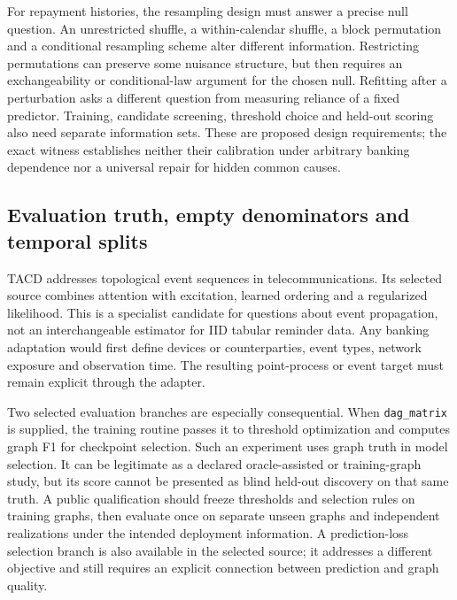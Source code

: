 For repayment histories, the resampling design must answer a precise null question. An unrestricted
shuffle, a within-calendar shuffle, a block permutation and a conditional resampling scheme alter
different information. Restricting permutations can preserve some nuisance structure, but then
requires an exchangeability or conditional-law argument for the chosen null. Refitting after a
perturbation asks a different question from measuring reliance of a fixed predictor. Training,
candidate screening, threshold choice and held-out scoring also need separate information sets.
These are proposed design requirements; the exact witness establishes neither their calibration
under arbitrary banking dependence nor a universal repair for hidden common causes.

\subsection{Evaluation truth, empty denominators and temporal splits}
TACD addresses topological event sequences in telecommunications. Its selected source combines
attention with excitation, learned ordering and a regularized likelihood. This is a specialist
candidate for questions about event propagation, not an interchangeable estimator for IID tabular
reminder data. Any banking adaptation would first define devices or counterparties, event types,
network exposure and observation time. The resulting point-process or event target must remain
explicit through the adapter.\citep{exec28_at_tacd}

Two selected evaluation branches are especially consequential. When \texttt{dag\_matrix} is supplied,
the training routine passes it to threshold optimization and computes graph F1 for checkpoint
selection. Such an experiment uses graph truth in model selection. It can be legitimate as a
declared oracle-assisted or training-graph study, but its score cannot be presented as blind
held-out discovery on that same truth. A public qualification should freeze thresholds and
selection rules on training graphs, then evaluate once on separate unseen graphs and independent
realizations under the intended deployment information. A prediction-loss selection branch is
also available in the selected source; it addresses a different objective and still requires
an explicit connection between prediction and graph quality.\citep{exec28_at_tacd}

